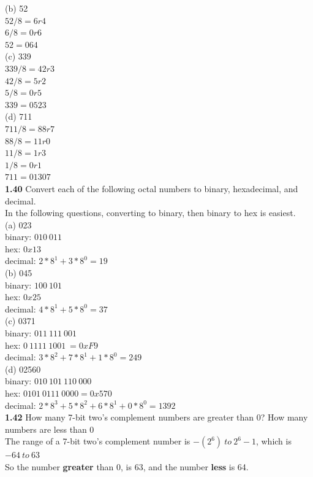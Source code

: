 \documentclass[12pt,a4paper]{report}
\begin{document}
\begin{normalsize}
(b) 52 \\
$ 52/8 = 6r4 $ \\
$ 6/8 = 0r6 $ \\
$ 52 = 064 $ \\

(c) 339 \\
$ 339/8 = 42r3 $ \\
$ 42/8 = 5r2 $ \\
$ 5/8 = 0r5 $ \\
$ 339 = 0523 $ \\

(d) 711 \\
$ 711/8 = 88r7 $ \\
$ 88/8 = 11r0 $ \\
$ 11/8 = 1r3 $ \\
$ 1/8 = 0r1 $ \\
$ 711 = 01307 $ \\

\textbf{1.40} Convert each of the following octal numbers to binary, hexadecimal, and decimal. \\
In the following questions, converting to binary, then binary to hex is easiest. \\

(a) 023 \\
binary: $ 010\: 011 $ \\
hex: $ 0x13 $ \\
decimal: $ 2*8^{1} + 3*8^{0} = 19 $ \\

(b) 045 \\
binary: $ 100\: 101 $ \\
hex: $ 0x25 $ \\
decimal: $ 4*8^{1} + 5*8^{0} = 37 $ \\

(c) 0371 \\
binary: $ 011\: 111\: 001 $ \\
hex: $ 0\: 1111\: 1001\: = 0xF9 $ \\
decimal: $ 3*8^{2} + 7*8^{1} + 1*8^{0} = 249 $ \\

(d) 02560 \\
binary: $ 010\: 101\: 110\: 000 $ \\
hex: $ 0101\: 0111\: 0000 = 0x570 $ \\
decimal: $ 2*8^{3} + 5*8^{2} + 6*8^{1} + 0*8^{0} = 1392 $ \\

\textbf{1.42} How many 7-bit two's complement numbers are greater than 0? How many numbers are less than 0 \\
The range of a 7-bit two's complement number is 
$ -(2^{6})\: to\: 2^{6}-1 $, which is $ -64\: to\: 63 $ \\
So the number \textbf{greater} than 0, is 63, and the number \textbf{less} is 64. \\


\end{normalsize}
\end{document}
